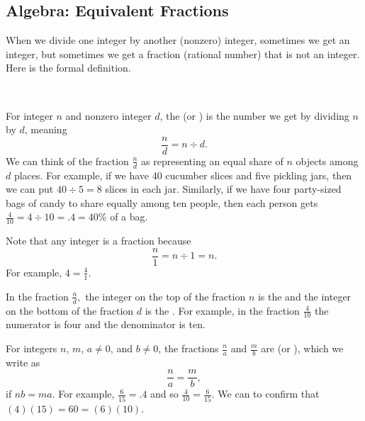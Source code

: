 \newcommand{\subfractions}{Algebra: Equivalent Fractions}
\subsection{\subfractions}
\label{sub_fractions}

When we divide one integer by another (nonzero) integer, sometimes we get an integer, but sometimes we get a fraction (rational number) that is not an integer.  Here is the formal definition.

\begin{defn}
\label{defn_fraction_rational}   
~
    \begin{apart}
        \item For integer $n$ and nonzero integer $d$, the  (or ) is the number we get by dividing $n$ by $d$, meaning
        $$\displaystyle \frac{n}{d} = n \div d.$$  
        We can think of the fraction $\frac{n}{d}$ as representing an equal share of $n$ objects among $d$ places.  For example, if we have 40 cucumber slices and five pickling jars, then we can put $40 \div 5 = 8$ slices in each jar.  Similarly, if we have four party-sized bags of candy to share equally among ten people, then each person gets $\frac{4}{10} = 4 \div 10 = .4 = 40\%$ of a bag.
        \item Note that any integer is a fraction because $$\frac{n}{1} = n \div 1 = n.$$  For example, $ 4 = \frac{4}{1}.$
        
        \item In the fraction $\frac{n}{d},$ the integer on the top of the fraction $n$ is the  and the integer on the bottom of the fraction $d$ is the . For example, in the fraction $\frac{4}{10}$ the numerator is four and the denominator is ten.
        
        \item \label{part_defn_equal_fractions} For integers $n$, $m$, $a \neq 0$, and $b \neq 0$, the fractions
        $\frac{n}{a}$ and 
        $\frac{m}{b}$ are  (or ), which we write as
        $$\frac{n}{a}=\frac{m}{b},$$ if $nb=ma.$
        For example, $\frac{6}{15} = .4$ and so      
        $\frac{4}{10}=\frac{6}{15}.$
        We can  to confirm that $(4)(15) = 60 = (6)(10).$        
    \end{apart}
\end{defn}

